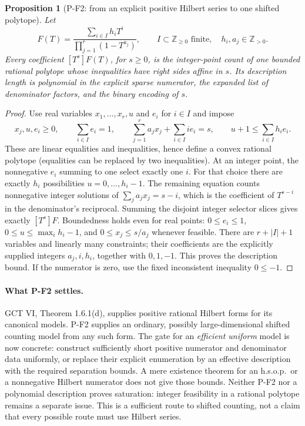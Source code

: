 \documentclass[11pt,a4paper]{article}
\newtheorem{proposition}{Proposition}[section]
\begin{document}
\begin{proposition}[P-F2: from an explicit positive Hilbert series to one shifted polytope]
\label{prop:selector}
Let
\[
 F(T)=\frac{\sum_{i\in I}h_iT^i}{\prod_{j=1}^{r}(1-T^{a_j})},
 \qquad I\subset\mathbb Z_{\ge0}\text{ finite},\quad
 h_i,a_j\in\mathbb Z_{>0}.
\]
Every coefficient $[T^s]F(T)$, for $s\ge0$, is the integer-point count
of one bounded rational polytope whose inequalities have right sides
affine in $s$. Its description length is polynomial in the explicit
sparse numerator, the expanded list of denominator factors, and the
binary encoding of $s$.
\end{proposition}
\begin{proof}
Use real variables $x_1,\ldots,x_r,u$ and $e_i$ for $i\in I$ and impose
\[
 x_j,u,e_i\ge0,\qquad
 \sum_{i\in I}e_i=1,\qquad
 \sum_{j=1}^{r}a_jx_j+\sum_{i\in I}i e_i=s,\qquad
 u+1\le\sum_{i\in I}h_i e_i.
 \tag{P-F2}
\]
These are linear equalities and inequalities, hence define a convex
rational polytope (equalities can be replaced by two inequalities).
At an integer point, the nonnegative $e_i$ summing to one select exactly
one $i$. For that choice there are exactly $h_i$ possibilities
$u=0,\ldots,h_i-1$. The remaining equation counts nonnegative integer
solutions of $\sum_j a_jx_j=s-i$, which is the coefficient of
$T^{s-i}$ in the denominator's reciprocal. Summing the disjoint integer
selector slices gives exactly $[T^s]F$.
Boundedness holds even for real points: $0\le e_i\le1$,
$0\le u\le\max_i h_i-1$, and $0\le x_j\le s/a_j$ whenever feasible.
There are $r+|I|+1$ variables and linearly many constraints; their
coefficients are the explicitly supplied integers $a_j,i,h_i$, together
with $0,1,-1$. This proves the description bound. If the numerator is
zero, use the fixed inconsistent inequality $0\le-1$.
\end{proof}

\paragraph{What P-F2 settles.}
GCT VI, Theorem 1.6.1(d), supplies positive rational Hilbert forms for
its canonical models. P-F2 supplies an ordinary, possibly
large-dimensional shifted counting model from any such form.
The gate for an \emph{efficient uniform} model is now concrete:
construct sufficiently short positive numerator and denominator data
uniformly, or replace their explicit enumeration by an effective
description with the required separation bounds. A mere existence
theorem for an h.s.o.p.\ or a nonnegative Hilbert numerator does not give
those bounds. Neither P-F2 nor a polynomial description proves
saturation: integer feasibility in a rational polytope remains a
separate issue. This is a sufficient route to shifted counting, not a
claim that every possible route must use Hilbert series.
\end{document}
